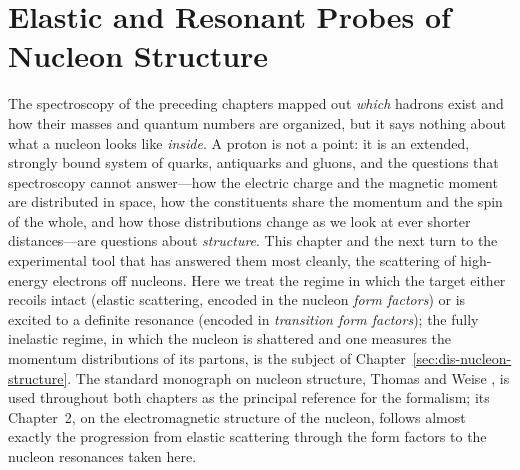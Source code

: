 %

\section{Elastic and Resonant Probes of Nucleon Structure}
\label{sec:electron-scattering}

The spectroscopy of the preceding chapters mapped out \emph{which} hadrons exist and
how their masses and quantum numbers are organized, but it says nothing about what a
nucleon looks like \emph{inside}. A proton is not a point: it is an extended,
strongly bound system of quarks, antiquarks and gluons, and the questions that
spectroscopy cannot answer---how the electric charge and the magnetic moment are
distributed in space, how the constituents share the momentum and the spin of the
whole, and how those distributions change as we look at ever shorter distances---are
questions about \emph{structure}. This chapter and the next turn to the experimental
tool that has answered them most cleanly, the scattering of high-energy electrons off
nucleons. Here we treat the regime in which the target either recoils intact
(elastic scattering, encoded in the nucleon \emph{form factors}) or is excited to a
definite resonance (encoded in \emph{transition form factors}); the fully inelastic
regime, in which the nucleon is shattered and one measures the momentum distributions
of its partons, is the subject of Chapter~\ref{sec:dis-nucleon-structure}. The standard
monograph on nucleon structure, Thomas and Weise \cite{ThomasWeise2001}, is used
throughout both chapters as the principal reference for the formalism; its Chapter~2,
on the electromagnetic structure of the nucleon, follows almost exactly the progression
from elastic scattering through the form factors to the nucleon resonances taken here.

